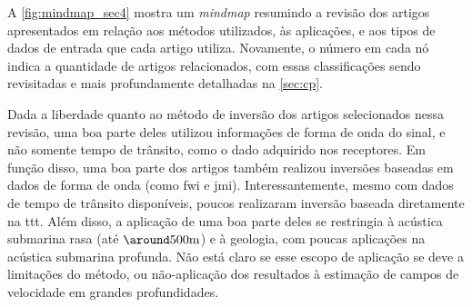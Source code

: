 A \cref{fig:mindmap_sec4} mostra um \textsl{mindmap} resumindo a revisão dos artigos apresentados em relação aos métodos utilizados, às aplicações, e aos tipos de dados de entrada que cada artigo utiliza. Novamente, o número em cada nó indica a quantidade de artigos relacionados, com essas classificações sendo revisitadas e mais profundamente detalhadas na \cref{sec:cp}.

Dada a liberdade quanto ao método de inversão dos artigos selecionados nessa revisão, uma boa parte deles utilizou informações de forma de onda do sinal, e não somente tempo de trânsito, como o dado adquirido nos receptores. Em função disso, uma boa parte dos artigos também realizou inversões baseadas em dados de forma de onda (como \gls{fwi} e \gls{jmi}). Interessantemente, mesmo com dados de tempo de trânsito disponíveis, poucos realizaram inversão baseada diretamente na \gls{ttt}. Além disso, a aplicação de uma boa parte deles se restringia à acústica submarina rasa (até $\around500\si{\meter}$) e à geologia, com poucas aplicações na acústica submarina profunda. Não está claro se esse escopo de aplicação se deve a limitações do método, ou não-aplicação dos resultados à estimação de campos de velocidade em grandes profundidades.